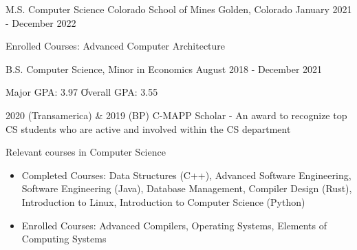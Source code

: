\vspace{-2.0mm}


\begin{cventries}


\cventry
    {M.S. Computer Science }
    {Colorado School of Mines} %
    {Golden, Colorado} %
    {January 2021 - December 2022} %
    {
      \begin{cvitems}
        \item {Enrolled Courses: Advanced Computer Architecture}
      \end{cvitems}
    }
    {}
    \vspace{-1.0mm}
  \cventry
    {B.S. Computer Science, Minor in Economics}
    {} %
    {} %
    {August 2018 - December 2021} %
    {
      \begin{cvitems} %
        \item {Major GPA: 3.97 \| Overall GPA: 3.55}
    \item {2020 (Transamerica) \& 2019 (BP) C-MAPP Scholar - An award to recognize top CS students who are active and involved within the CS department}
        \ifcv
        \item{Relevant courses in Computer Science}
        \begin{itemize}
          \item {Completed Courses: Data Structures (C++), Advanced Software Engineering, Software Engineering (Java), Database Management, Compiler Design (Rust), Introduction to Linux, Introduction to Computer Science (Python)}
          \item {Enrolled Courses: Advanced Compilers, Operating Systems, Elements of Computing Systems}

\end{itemize}
\end{cvitems}}
\end{cventries}
